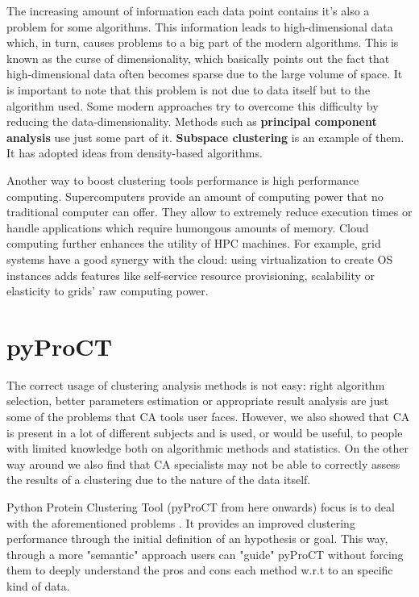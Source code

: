 The increasing amount of information each data point contains it's also a problem for some algorithms. This information leads to high-dimensional data which, in turn, causes problems to a big part of the modern algorithms. This is known as the curse of dimensionality, which basically points out the fact that high-dimensional data often becomes sparse due to the large volume of space. It is important to note that this problem is not due to data itself but to the algorithm used. Some modern approaches try to overcome this difficulty by reducing the data-dimensionality. Methods such as \textbf{principal component analysis} \cite{Kupski2015} use just some part of it. \textbf{Subspace clustering} \cite{Adler2015} is an example of them. It has adopted ideas from density-based algorithms.

Another way to boost clustering tools performance is high performance computing. Supercomputers provide an amount of computing power that no traditional computer can offer. They allow to extremely reduce execution times or handle applications which require humongous amounts of memory. Cloud computing further enhances the utility of HPC machines. For example, grid systems have a good synergy with the cloud: using virtualization to create OS instances adds features like self-service resource provisioning, scalability or elasticity to grids' raw computing power.\cite{Armbrust2010}\cite{Foster2008}



\section{pyProCT}

The correct usage of clustering analysis methods is not easy: right algorithm selection, better parameters estimation or appropriate result analysis are just some of the problems that CA tools user faces. However, we also showed that CA is present in a lot of different subjects and is used, or would be useful, to people with  limited knowledge both on algorithmic methods and statistics. On the other way around we also find that CA specialists may not be able to correctly assess the results of a clustering due to the nature of the data itself.

Python Protein Clustering Tool \cite{Gil2014} (pyProCT from here onwards) focus is to deal with the aforementioned problems . It provides an improved clustering performance through the initial definition of an hypothesis or goal. This way, through a more "semantic" approach users can "guide" pyProCT without forcing them to deeply understand the pros and cons each method w.r.t to an specific kind of data.

